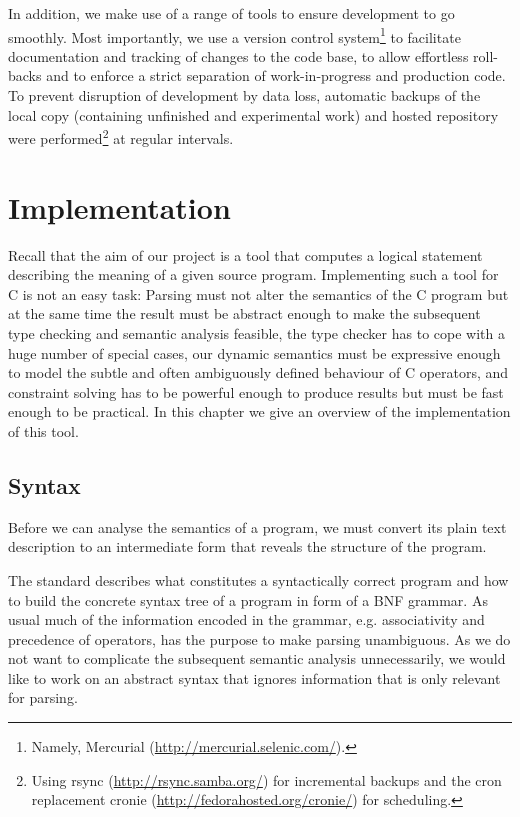 \documentclass[a4paper,12pt]{scrbook}
\theoremstyle{plain}
\theoremstyle{definition}
\newcommand{\name}[1]{\textsf{#1}}
\begin{document}
In addition, we make use of a range of tools to ensure development to go
smoothly. Most importantly, we use a version control system\footnote{Namely,
  \name{Mercurial} (\url{http://mercurial.selenic.com/}).} to facilitate
documentation and tracking of changes to the code base, to allow effortless
roll-backs and to enforce a strict separation of work-in-progress and production
code. To prevent disruption of development by data loss, automatic backups of
the local copy (containing unfinished and experimental work) and hosted
repository were performed\footnote{Using \name{rsync}
  (\url{http://rsync.samba.org/}) for incremental backups and the cron
  replacement \name{cronie} (\url{http://fedorahosted.org/cronie/}) for
  scheduling.} at regular intervals.

\chapter{Implementation}\label{chapter3}
Recall that the aim of our project is a tool that computes a logical statement
describing the meaning of a given source program. Implementing such a tool for C
is not an easy task: Parsing must not alter the semantics of the C program but
at the same time the result must be abstract enough to make the subsequent type
checking and semantic analysis feasible, the type checker has to cope with a
huge number of special cases, our dynamic semantics must be expressive enough to
model the subtle and often ambiguously defined behaviour of C operators, and
constraint solving has to be powerful enough to produce results but must be fast
enough to be practical. In this chapter we give an overview of the
implementation of this tool.

\section{Syntax}
Before we can analyse the semantics of a program, we must convert its plain
text description to an intermediate form that reveals the structure of the
program.

The standard describes what constitutes a syntactically correct program and how
to build the concrete syntax tree of a program in form of a BNF grammar.  As
usual much of the information encoded in the grammar, e.g. associativity and
precedence of operators, has the purpose to make parsing unambiguous. As we do
not want to complicate the subsequent semantic analysis unnecessarily, we
would like to work on an abstract syntax that ignores information that is only
relevant for parsing.
\end{document}
